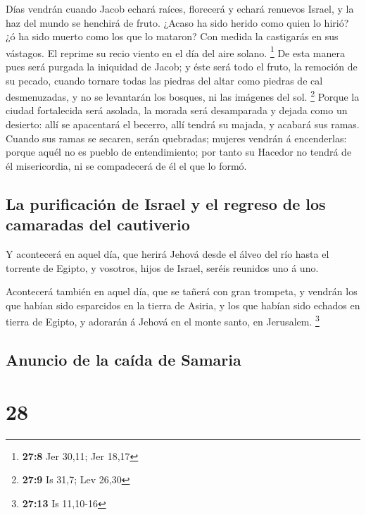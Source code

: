  Días vendrán cuando Jacob echará raíces, florecerá y echará
renuevos Israel, y la haz del mundo se henchirá de fruto. 
¿Acaso ha sido herido como quien lo hirió? ¿ó ha sido muerto como los
que lo mataron?  Con medida la castigarás en sus vástagos.
El reprime su recio viento en el día del aire solano. \footnote{\textbf{27:8}
  Jer 30,11; Jer 18,17}  De esta manera pues será purgada la
iniquidad de Jacob; y éste será todo el fruto, la remoción de su pecado,
cuando tornare todas las piedras del altar como piedras de cal
desmenuzadas, y no se levantarán los bosques, ni las imágenes del sol.
\footnote{\textbf{27:9} Is 31,7; Lev 26,30}  Porque la
ciudad fortalecida será asolada, la morada será desamparada y dejada
como un desierto: allí se apacentará el becerro, allí tendrá su majada,
y acabará sus ramas.  Cuando sus ramas se secaren, serán
quebradas; mujeres vendrán á encenderlas: porque aquél no es pueblo de
entendimiento; por tanto su Hacedor no tendrá de él misericordia, ni se
compadecerá de él el que lo formó.

\hypertarget{la-purificaciuxf3n-de-israel-y-el-regreso-de-los-camaradas-del-cautiverio}{%
\subsection{La purificación de Israel y el regreso de los camaradas del
cautiverio}\label{la-purificaciuxf3n-de-israel-y-el-regreso-de-los-camaradas-del-cautiverio}}

 Y acontecerá en aquel día, que herirá Jehová desde el
álveo del río hasta el torrente de Egipto, y vosotros, hijos de Israel,
seréis reunidos uno á uno.

 Acontecerá también en aquel día, que se tañerá con gran
trompeta, y vendrán los que habían sido esparcidos en la tierra de
Asiria, y los que habían sido echados en tierra de Egipto, y adorarán á
Jehová en el monte santo, en Jerusalem. \footnote{\textbf{27:13} Is
  11,10-16}

\hypertarget{anuncio-de-la-cauxedda-de-samaria}{%
\subsection{Anuncio de la caída de
Samaria}\label{anuncio-de-la-cauxedda-de-samaria}}

\hypertarget{section-27}{%
\section{28}\label{section-27}}

